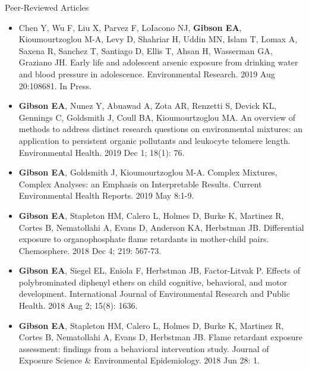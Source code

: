 \documentclass[a4paper,10pt]{article}
\newlength{\cvcolumngapwidth}
\newlength{\cvleftcolumnwidth}
\newlength{\cvrightcolumnwidth}
\newcommand{\cvdurationstyle}[1]{{\small\cvdurationfont\textcolor{cvdurationcolor}{#1}}}
\newlength{\cvafteritemskipamount}
\newlength{\cvparskip}
\newcommand{\cvitem}[2]{
    \begin{minipage}[t]{\cvleftcolumnwidth}
        \raggedleft #1
    \end{minipage}%
    \hspace{\cvcolumngapwidth}%
    \begin{minipage}[t]{\cvrightcolumnwidth}
        \setlength{\parskip}{\cvparskip} #2
    \end{minipage}

    \vspace{\cvafteritemskipamount}
}
\begin{document}
\cvitem{
    \cvdurationstyle{Peer-Reviewed Articles}
}{  
    \begin{itemize}[leftmargin=*]
	\item Chen Y, Wu F, Liu X, Parvez F, LoIacono NJ, \textbf{Gibson EA}, Kioumourtzoglou M-A, Levy D, Shahriar H, Uddin MN, Islam T, Lomax A, Saxena R, Sanchez T, Santiago D, Ellis T, Ahsan H, Wasserman GA, Graziano JH. Early life and adolescent arsenic exposure from drinking water and blood pressure in adolescence. Environmental Research. 2019 Aug 20:108681. In Press. \\
\vspace{.5mm}
	\item \textbf{Gibson EA}, Nunez Y, Abuawad A, Zota AR, Renzetti S, Devick KL, Gennings C, Goldsmith J, Coull BA, Kioumourtzoglou MA. An overview of methods to address distinct research questions on environmental mixtures: an application to persistent organic pollutants and leukocyte telomere length. Environmental Health. 2019 Dec 1; 18(1): 76. \\
\vspace{.5mm}
	\item \textbf{Gibson EA}, Goldsmith J, Kioumourtzoglou M-A. Complex Mixtures, Complex Analyses: an Emphasis on Interpretable Results. Current Environmental Health Reports. 2019 May 8:1-9. \\
	\item \textbf{Gibson EA}, Stapleton HM, Calero L, Holmes D, Burke K, Martinez R, Cortes B, Nematollahi A, Evans D, Anderson KA, Herbstman JB. Differential exposure to organophosphate flame retardants in mother-child pairs. Chemosphere. 2018 Dec 4; 219: 567-73. \\
\vspace{.5mm}
	\item \textbf{Gibson EA}, Siegel EL, Eniola F, Herbstman JB, Factor-Litvak P. Effects of polybrominated diphenyl ethers on child cognitive, behavioral, and motor development. International Journal of Environmental Research and Public Health. 2018 Aug 2; 15(8): 1636. \\
\vspace{.5mm}
	\item \textbf{Gibson EA}, Stapleton HM, Calero L, Holmes D, Burke K, Martinez R, Cortes B, Nematollahi A, Evans D, Herbstman JB. Flame retardant exposure assessment: findings from a behavioral intervention study. Journal of Exposure Science \& Environmental Epidemiology. 2018 Jun 28: 1. \\
\vspace{.5mm}

\end{itemize}}
\end{document}
